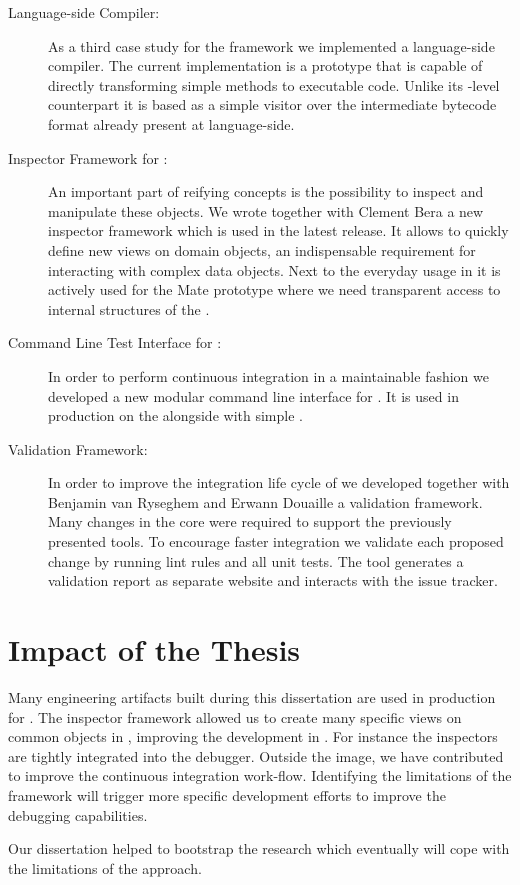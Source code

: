 \begin{description}
	\item[\NBJ Language-side \JIT Compiler:]
		As a third case study for the \B framework we implemented a language-side \JIT compiler. 
		The current implementation is a prototype that is capable of directly transforming simple methods to executable code.
		Unlike its \VM-level counterpart it is based as a simple visitor over the intermediate bytecode format already present at language-side.

	\item[Inspector Framework for \PH:] 
		An important part of reifying concepts is the possibility to inspect and manipulate these objects.
		We wrote together with Clement Bera a new inspector framework which is used in the latest \PH release.
		It allows to quickly define new views on domain objects, an indispensable requirement for interacting with complex data objects.
		Next to the everyday usage in \PH it is actively used for the Mate \VM prototype where we need transparent access to internal structures of the \VM.

	\item[Command Line Test Interface for \PH:]
		In order to perform continuous integration in a maintainable fashion we developed a new modular command line interface for \PH. 
		It is used in production on the  alongside with simple .
		
	\item[Validation Framework:]
		In order to improve the integration life cycle of \PH we developed together with Benjamin van Ryseghem and Erwann Douaille a validation framework.
		Many changes in the core \PH were required to support the previously presented tools.
		To encourage faster integration we validate each proposed change by running lint rules and all unit tests.
		The tool generates a validation report as separate website and interacts with the issue tracker.
\end{description}


\section{Impact of the Thesis}
Many engineering artifacts built during this dissertation are used in production for \PH.
The inspector framework allowed us to create many specific views on common objects in \PH, improving the development in \PH.
For instance the inspectors are tightly integrated into the debugger.
Outside the image, we have contributed to improve the \PH continuous integration work-flow.
Identifying the limitations of the \B framework will trigger more specific development efforts to improve the debugging capabilities.

Our dissertation helped to bootstrap the \Mate research \VM which eventually will cope with the limitations of the \B approach.


